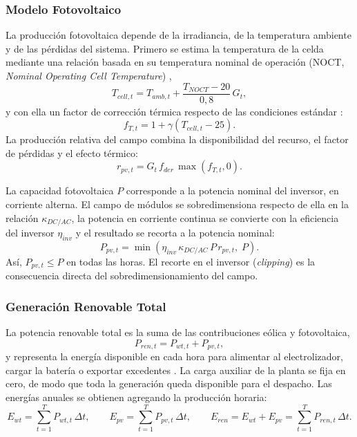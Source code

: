 \subsubsection{Modelo Fotovoltaico}

La producción fotovoltaica depende de la irradiancia, de la temperatura ambiente y de las pérdidas del sistema. Primero se estima la temperatura de la celda mediante una relación basada en su temperatura nominal de operación (NOCT, \emph{Nominal Operating Cell Temperature}) \cite{Li2024WPEB,Khan2022Review},
\begin{equation}
T_{cell,t}=T_{amb,t}+\frac{T_{NOCT}-20}{0{,}8}\,G_t,
\end{equation}
y con ella un factor de corrección térmica respecto de las condiciones estándar \cite{Li2024WPEB}:
\begin{equation}
f_{T,t}=1+\gamma\left(T_{cell,t}-25\right).
\end{equation}
La producción relativa del campo combina la disponibilidad del recurso, el factor de pérdidas y el efecto térmico:
\begin{equation}
r_{pv,t}=G_t\,f_{der}\,\max\left(f_{T,t},0\right).
\end{equation}

La capacidad fotovoltaica $P$ corresponde a la potencia nominal del inversor, en corriente alterna. El campo de módulos se sobredimensiona respecto de ella en la relación $\kappa_{DC/AC}$, la potencia en corriente continua se convierte con la eficiencia del inversor $\eta_{inv}$ y el resultado se recorta a la potencia nominal:
\begin{equation}
P_{pv,t}=\min\left(\eta_{inv}\,\kappa_{DC/AC}\,P\,r_{pv,t},\;P\right).
\end{equation}
Así, $P_{pv,t}\leq P$ en todas las horas. El recorte en el inversor (\textit{clipping}) es la consecuencia directa del sobredimensionamiento del campo.

\subsubsection{Generación Renovable Total}

La potencia renovable total es la suma de las contribuciones eólica y fotovoltaica,
\begin{equation}
P_{ren,t}=P_{wt,t}+P_{pv,t},
\end{equation}
y representa la energía disponible en cada hora para alimentar al electrolizador, cargar la batería o exportar excedentes \cite{Li2024WPEB}. La carga auxiliar de la planta se fija en cero, de modo que toda la generación queda disponible para el despacho. Las energías anuales se obtienen agregando la producción horaria:
\begin{equation}
E_{wt}=\sum_{t=1}^{T}P_{wt,t}\,\Delta t,\qquad
E_{pv}=\sum_{t=1}^{T}P_{pv,t}\,\Delta t,\qquad
E_{ren}=E_{wt}+E_{pv}=\sum_{t=1}^{T}P_{ren,t}\,\Delta t.
\end{equation}

